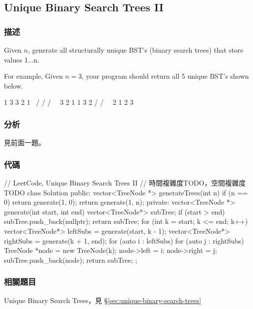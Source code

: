 \subsection{Unique Binary Search Trees II}
\label{sec:unique-binary-search-trees-ii}


\subsubsection{描述}
Given $n$, generate all structurally unique BST's (binary search trees) that store values 1...n.

For example,
Given $n = 3$, your program should return all 5 unique BST's shown below.
\begin{Code}
   1         3     3      2      1
    \       /     /      / \      \
     3     2     1      1   3      2
    /     /       \                 \
   2     1         2                 3
\end{Code}


\subsubsection{分析}
見前面一題。


\subsubsection{代碼}

\begin{Code}
// LeetCode, Unique Binary Search Trees II
// 時間複雜度TODO，空間複雜度TODO
class Solution {
public:
    vector<TreeNode *> generateTrees(int n) {
        if (n == 0) return generate(1, 0);
        return generate(1, n);
    }
private:
    vector<TreeNode *> generate(int start, int end) {
        vector<TreeNode*> subTree;
        if (start > end) {
            subTree.push_back(nullptr);
            return subTree;
        }
        for (int k = start; k <= end; k++) {
            vector<TreeNode*> leftSubs = generate(start, k - 1);
            vector<TreeNode*> rightSubs = generate(k + 1, end);
            for (auto i : leftSubs) {
                for (auto j : rightSubs) {
                    TreeNode *node = new TreeNode(k);
                    node->left = i;
                    node->right = j;
                    subTree.push_back(node);
                }
            }
        }
        return subTree;
    }
};
\end{Code}


\subsubsection{相關題目}
\begindot
\item Unique Binary Search Trees，見 \S \ref{sec:unique-binary-search-trees}
\myenddot


